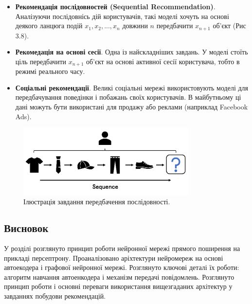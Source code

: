 \begin{itemize}
    \item \textbf{Рекомендація послідовностей (Sequential Recommendation)}. Аналізуючи послідовнісь дій користувачів, такі моделі хочуть на основі деякого ланцюга подій  ${x_1, x_2, ..., x_n}$ довжини $n$ передбачити $x_{n+1}$ об’єкт (Рис 3.8).
    \item \textbf{Рекомедація на основі сесії}. Одна із найскладніших завдань. У моделі стоїть ціль передбачити $x_{n+1}$ об’єкт на основі активної сесії користувача, тобто в режимі реального часу.
    \item \textbf{Соціальні рекомендації}. Великі соціальні мережі використовують моделі для передбачування поведінки і побажань своїх користувачів. В майбутньому ці дані можуть бути використані для продажу або реклами (наприклад Facebook Ads).

\end{itemize}

\begin{figure}
    \centering
    \includegraphics[width=0.8\textwidth]{images/Seq_rec.png}
    \caption{Ілюстрація завдання передбачення послідовності.}
    \end{figure}
\subsection*{Висновок}
У розділі розглянуто принцип роботи нейронної мережі прямого поширення на прикладі персептрону. Проаналізовано аріхтектури нейромереж на основі автоекодера і графової нейронної мережі. Розглянуто ключові деталі їх роботи: алгоритм навчання автоенкодера і механізм передачі повідомлень. Розглянуто принцип роботи і основні переваги використання вищезгаданих архітектур у завданнях побудови рекомендацій.